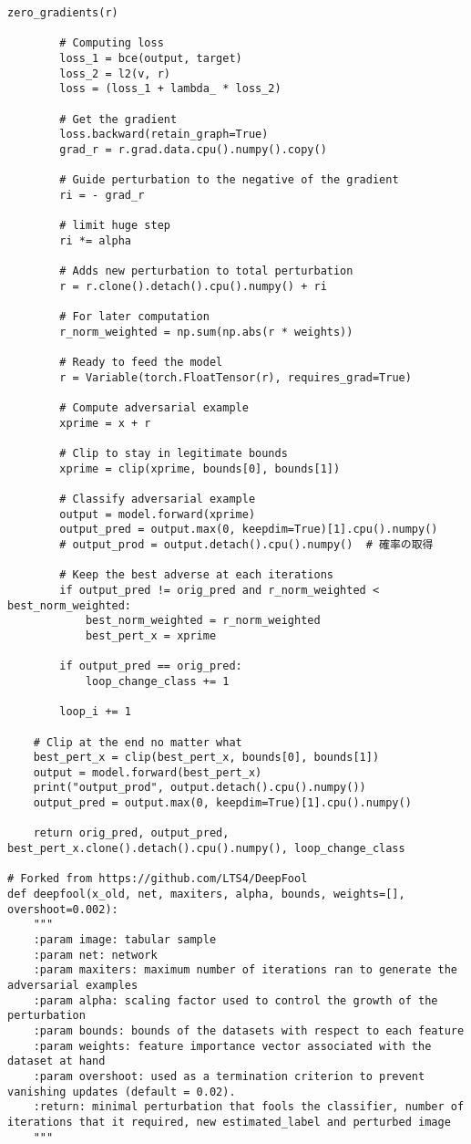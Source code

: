 \begin{lstlisting}[style=python, caption=LowProFool関数などが記載されているAdverse.py]
        zero_gradients(r)

        # Computing loss 
        loss_1 = bce(output, target)
        loss_2 = l2(v, r)
        loss = (loss_1 + lambda_ * loss_2)

        # Get the gradient
        loss.backward(retain_graph=True)
        grad_r = r.grad.data.cpu().numpy().copy()
        
        # Guide perturbation to the negative of the gradient
        ri = - grad_r
    
        # limit huge step
        ri *= alpha

        # Adds new perturbation to total perturbation
        r = r.clone().detach().cpu().numpy() + ri
        
        # For later computation
        r_norm_weighted = np.sum(np.abs(r * weights))
        
        # Ready to feed the model
        r = Variable(torch.FloatTensor(r), requires_grad=True) 
        
        # Compute adversarial example
        xprime = x + r
        
        # Clip to stay in legitimate bounds
        xprime = clip(xprime, bounds[0], bounds[1])
        
        # Classify adversarial example
        output = model.forward(xprime)
        output_pred = output.max(0, keepdim=True)[1].cpu().numpy()
        # output_prod = output.detach().cpu().numpy()  # 確率の取得
        
        # Keep the best adverse at each iterations
        if output_pred != orig_pred and r_norm_weighted < best_norm_weighted:
            best_norm_weighted = r_norm_weighted
            best_pert_x = xprime

        if output_pred == orig_pred:
            loop_change_class += 1
            
        loop_i += 1

    # Clip at the end no matter what
    best_pert_x = clip(best_pert_x, bounds[0], bounds[1])
    output = model.forward(best_pert_x)
    print("output_prod", output.detach().cpu().numpy())
    output_pred = output.max(0, keepdim=True)[1].cpu().numpy()

    return orig_pred, output_pred, best_pert_x.clone().detach().cpu().numpy(), loop_change_class 

# Forked from https://github.com/LTS4/DeepFool
def deepfool(x_old, net, maxiters, alpha, bounds, weights=[], overshoot=0.002):
    """
    :param image: tabular sample
    :param net: network 
    :param maxiters: maximum number of iterations ran to generate the adversarial examples
    :param alpha: scaling factor used to control the growth of the perturbation
    :param bounds: bounds of the datasets with respect to each feature
    :param weights: feature importance vector associated with the dataset at hand
    :param overshoot: used as a termination criterion to prevent vanishing updates (default = 0.02).
    :return: minimal perturbation that fools the classifier, number of iterations that it required, new estimated_label and perturbed image
    """
    

\end{lstlisting}
